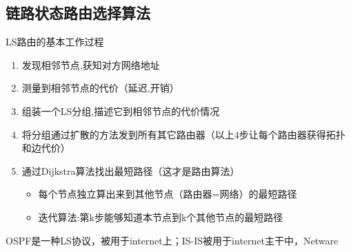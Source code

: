 \documentclass[]{report}
\begin{document}
		\subsection{链路状态路由选择算法}
		LS路由的基本工作过程
		\begin{enumerate}
			\item 发现相邻节点,获知对方网络地址
			\item 测量到相邻节点的代价（延迟,开销）
			\item 组装一个LS分组,描述它到相邻节点的代价情况
			\item 将分组通过扩散的方法发到所有其它路由器（以上4步让每个路由器获得拓扑和边代价）
			\item 通过Dijkstra算法找出最短路径（这才是路由算法）
			\begin{itemize}
				\item 每个节点独立算出来到其他节点（路由器=网络）的最短路径
				\item 迭代算法:第k步能够知道本节点到k个其他节点的最短路径
			\end{itemize}
		\end{enumerate}
		OSPF是一种LS协议，被用于internet上；IS-IS被用于internet主干中，Netware
\end{document}
